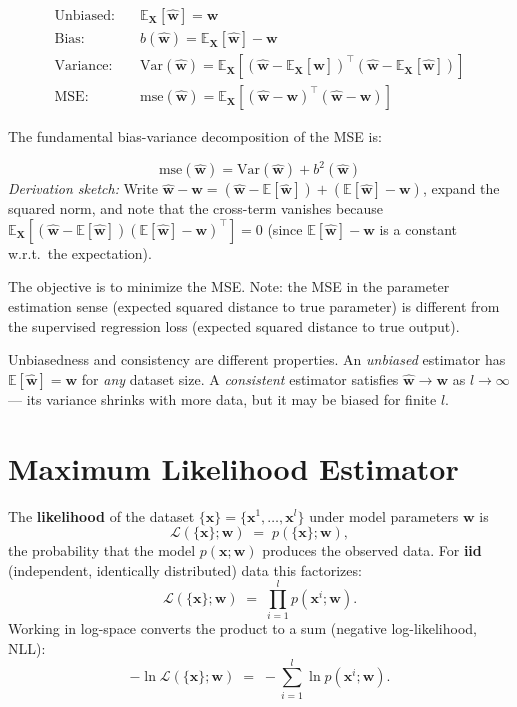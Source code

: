 \documentclass[11pt, oneside]{book}
\newcommand{\E}{\mathbb{E}}
\newcommand{\Var}{\mathrm{Var}}
\newcommand{\T}{^{\top}}
\newcommand{\wvec}{\bm{w}}
\newcommand{\what}{\hat{\bm{w}}}
\newcommand{\xvec}{\bm{x}}
\newcommand{\Xmat}{\bm{X}}
\newcommand{\lhood}{\mathcal{L}}
\newcommand{\mse}{\mathrm{mse}}
\newcommand{\bias}{b}
\begin{document}
\begin{defbox}[title={Estimator Quality Measures}]
\begin{align*}
  \text{Unbiased:} \quad & \E_{\Xmat}[\what] = \wvec \\[4pt]
  \text{Bias:} \quad & \bias(\what) = \E_{\Xmat}[\what] - \wvec \\[4pt]
  \text{Variance:} \quad & \Var(\what) = \E_{\Xmat}\!\left[(\what - \E_{\Xmat}[\what])\T(\what - \E_{\Xmat}[\what])\right] \\[4pt]
  \text{MSE:} \quad & \mse(\what) = \E_{\Xmat}\!\left[(\what - \wvec)\T(\what - \wvec)\right]
\end{align*}
\end{defbox}

The fundamental bias-variance decomposition of the MSE is:

\begin{thmbox}[title={Bias-Variance Decomposition}]
\[
  \mse(\what) = \Var(\what) + \bias^2(\what)
\]
\emph{Derivation sketch:} Write $\what - \wvec = (\what - \E[\what]) + (\E[\what] - \wvec)$,
expand the squared norm, and note that the cross-term vanishes because
$\E_{\Xmat}[(\what - \E[\what])(\E[\what] - \wvec)\T] = 0$
(since $\E[\what] - \wvec$ is a constant w.r.t.\ the expectation).
\end{thmbox}

The objective is to minimize the MSE.
Note: the MSE in the parameter estimation sense (expected squared distance to true
parameter) is different from the supervised regression loss (expected squared distance
to true output).

\begin{intbox}
  Unbiasedness and consistency are different properties.
  An \emph{unbiased} estimator has $\E[\what] = \wvec$ for \emph{any} dataset size.
  A \emph{consistent} estimator satisfies $\what \to \wvec$ as $l \to \infty$ ---
  its variance shrinks with more data, but it may be biased for finite $l$.
\end{intbox}


\section{Maximum Likelihood Estimator}
\label{sec:mle}

\begin{defbox}[title={Likelihood}]
The \textbf{likelihood} of the dataset $\{\xvec\} = \{\xvec^1,\ldots,\xvec^l\}$ under
model parameters $\wvec$ is
\[
  \lhood(\{\xvec\};\wvec) \;=\; p(\{\xvec\};\wvec),
\]
the probability that the model $p(\xvec;\wvec)$ produces the observed data.
For \textbf{iid} (independent, identically distributed) data this factorizes:
\[
  \lhood(\{\xvec\};\wvec) \;=\; \prod_{i=1}^{l} p(\xvec^i;\wvec).
\]
Working in log-space converts the product to a sum (negative log-likelihood, NLL):
\[
  -\ln \lhood(\{\xvec\};\wvec) \;=\; -\sum_{i=1}^{l} \ln p(\xvec^i;\wvec).
\]
\end{defbox}
\end{document}
